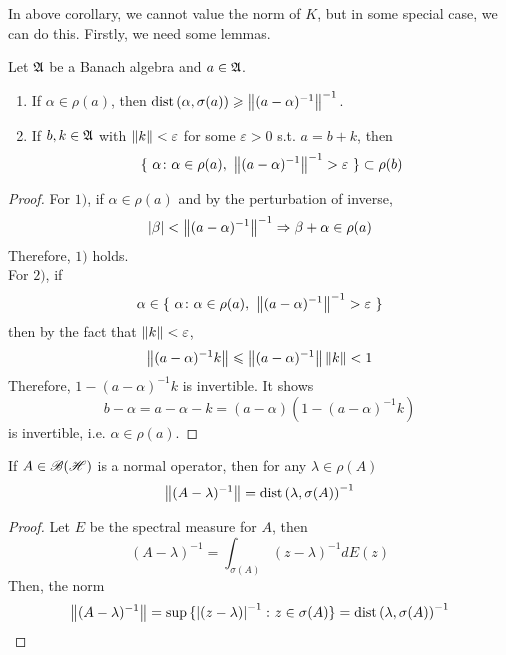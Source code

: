 \documentclass[a4paper,11pt]{report}
\begin{document}
In above corollary, we cannot value the norm of $K$, but in some special case, we can do this. Firstly, we need some lemmas.
\begin{lem}
	Let $\mathfrak{A}$ be a Banach algebra and $a \in \mathfrak{A}$.
	\begin{enumerate}[label=\arabic*)]
		\item If $\alpha \in \rho(a)$, then $\operatorname{dist}{(\alpha,\sigma(a))} \geqslant \left\lVert(a-\alpha)^{-1}\right\lVert^{-1}$.
		\item If $b,k \in \mathfrak{A}$ with $\left\lVert k\right\lVert < \varepsilon$ for some $\varepsilon > 0$ s.t. $a = b + k$, then 
		\begin{equation*}
			\{~\alpha \colon \alpha \in \rho(a),~ \left\lVert(a-\alpha)^{-1}\right\lVert^{-1} > \varepsilon~\} \subset \rho(b)
		\end{equation*}
	\end{enumerate}
\end{lem}
\begin{proof}
	For $1)$, if $\alpha \in \rho(a)$ and by the perturbation of inverse, 
	\begin{equation*}
		\left\lvert\beta\right\lvert < \left\lVert(a-\alpha)^{-1}\right\lVert^{-1} \Rightarrow \beta + \alpha \in \rho(a)
 	\end{equation*}
 	Therefore, $1)$ holds. \\
 	For $2)$, if
 	\begin{equation*}
 		\alpha \in \{~\alpha \colon \alpha \in \rho(a),~ \left\lVert(a-\alpha)^{-1}\right\lVert^{-1} > \varepsilon~\}
 	\end{equation*}
 	then by the fact that $\left\lVert k\right\lVert < \varepsilon$, 
 	\begin{equation*}
 		\left\lVert(a-\alpha)^{-1} k\right\lVert \leqslant \left\lVert(a-\alpha)^{-1}\right\lVert \left\lVert k\right\lVert < 1
 	\end{equation*}
 	Therefore, $1 - (a-\alpha)^{-1} k$ is invertible. It shows
 	\begin{equation*}
 		b - \alpha = a - \alpha - k = (a - \alpha)(1 - (a-\alpha)^{-1} k)
 	\end{equation*}
 	is invertible, i.e. $\alpha \in \rho(a)$.
\end{proof}

\begin{lem}
	If $A \in \mathscr{B(H)}$ is a normal operator, then for any $\lambda \in \rho(A)$
	\begin{equation*}
		\left\lVert(A-\lambda)^{-1}\right\lVert = \operatorname{dist}{(\lambda, \sigma(A))}^{-1}
	\end{equation*}
\end{lem}
\begin{proof}
	Let $E$ be the spectral measure for $A$, then
	\begin{equation*}
		(A-\lambda)^{-1} = \int_{\sigma(A)} (z - \lambda)^{-1} dE(z)
	\end{equation*}
	Then, the norm
	\begin{equation*}
		\left\lVert(A-\lambda)^{-1}\right\lVert = \sup{\{\left\lvert(z-\lambda)\right\lvert^{-1} \colon z \in \sigma(A)\}} = \operatorname{dist}{(\lambda, \sigma(A))}^{-1} \qedhere
	\end{equation*}
\end{proof}
\end{document}
